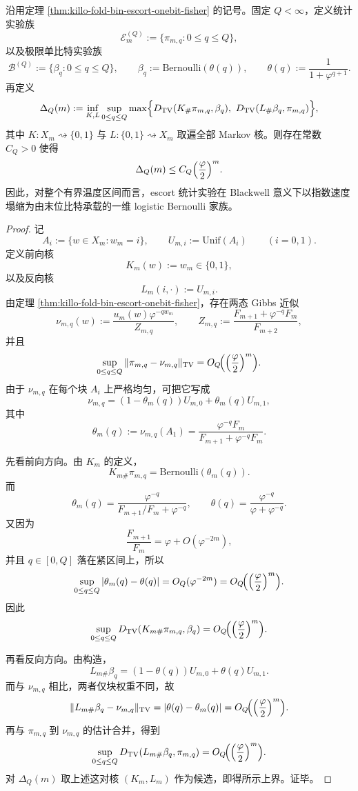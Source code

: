 \begin{theorem}\label{thm:xi-time-part65h-escort-blackwell-onebit-equivalence}
沿用定理 \ref{thm:killo-fold-bin-escort-onebit-fisher} 的记号。固定 \(Q<\infty\)，定义统计实验族
\[
\mathcal E_m^{(Q)}:=\{\pi_{m,q}:0\le q\le Q\},
\]
以及极限单比特实验族
\[
\mathcal B^{(Q)}:=\{\beta_q:0\le q\le Q\},
\qquad
\beta_q:=\mathrm{Bernoulli}(\theta(q)),
\qquad
\theta(q):=\frac{1}{1+\varphi^{q+1}}.
\]
再定义
\[
\Delta_Q(m):=
\inf_{K,L}\sup_{0\le q\le Q}
\max\Bigl\{
D_{\mathrm{TV}}(K_{\#}\pi_{m,q},\beta_q),\
D_{\mathrm{TV}}(L_{\#}\beta_q,\pi_{m,q})
\Bigr\},
\]
其中 \(K:X_m\rightsquigarrow\{0,1\}\) 与 \(L:\{0,1\}\rightsquigarrow X_m\) 取遍全部 Markov 核。则存在常数 \(C_Q>0\) 使得
\[
\Delta_Q(m)\le C_Q\Bigl(\frac{\varphi}{2}\Bigr)^m.
\]
因此，对整个有界温度区间而言，escort 统计实验在 Blackwell 意义下以指数速度塌缩为由末位比特承载的一维 logistic Bernoulli 家族。
\end{theorem}
\begin{proof}
记
\[
A_i:=\{w\in X_m:w_m=i\},
\qquad
U_{m,i}:=\mathrm{Unif}(A_i)
\qquad (i=0,1).
\]
定义前向核
\[
K_m(w):=w_m\in\{0,1\},
\]
以及反向核
\[
L_m(i,\cdot):=U_{m,i}.
\]
由定理 \ref{thm:killo-fold-bin-escort-onebit-fisher}，存在两态 Gibbs 近似
\[
\nu_{m,q}(w):=\frac{u_m(w)\varphi^{-qw_m}}{Z_{m,q}},
\qquad
Z_{m,q}:=\frac{F_{m+1}+\varphi^{-q}F_m}{F_{m+2}},
\]
并且
\[
\sup_{0\le q\le Q}\|\pi_{m,q}-\nu_{m,q}\|_{\mathrm{TV}}
=
O_Q\!\Bigl(\Bigl(\frac{\varphi}{2}\Bigr)^m\Bigr).
\]
由于 \(\nu_{m,q}\) 在每个块 \(A_i\) 上严格均匀，可把它写成
\[
\nu_{m,q}=(1-\theta_m(q))U_{m,0}+\theta_m(q)U_{m,1},
\]
其中
\[
\theta_m(q):=\nu_{m,q}(A_1)
=
\frac{\varphi^{-q}F_m}{F_{m+1}+\varphi^{-q}F_m}.
\]

先看前向方向。由 \(K_m\) 的定义，
\[
K_{m\#}\pi_{m,q}=\mathrm{Bernoulli}(\theta_m(q)).
\]
而
\[
\theta_m(q)=\frac{\varphi^{-q}}{F_{m+1}/F_m+\varphi^{-q}},
\qquad
\theta(q)=\frac{\varphi^{-q}}{\varphi+\varphi^{-q}}.
\]
又因为
\[
\frac{F_{m+1}}{F_m}=\varphi+O(\varphi^{-2m}),
\]
并且 \(q\in[0,Q]\) 落在紧区间上，所以
\[
\sup_{0\le q\le Q}|\theta_m(q)-\theta(q)|
=
O_Q(\varphi^{-2m})
=
O_Q\!\Bigl(\Bigl(\frac{\varphi}{2}\Bigr)^m\Bigr).
\]
因此
\[
\sup_{0\le q\le Q}
D_{\mathrm{TV}}(K_{m\#}\pi_{m,q},\beta_q)
=
O_Q\!\Bigl(\Bigl(\frac{\varphi}{2}\Bigr)^m\Bigr).
\]

再看反向方向。由构造，
\[
L_{m\#}\beta_q=(1-\theta(q))U_{m,0}+\theta(q)U_{m,1}.
\]
而与 \(\nu_{m,q}\) 相比，两者仅块权重不同，故
\[
\|L_{m\#}\beta_q-\nu_{m,q}\|_{\mathrm{TV}}
=
|\theta(q)-\theta_m(q)|
=
O_Q\!\Bigl(\Bigl(\frac{\varphi}{2}\Bigr)^m\Bigr).
\]
再与 \(\pi_{m,q}\) 到 \(\nu_{m,q}\) 的估计合并，得到
\[
\sup_{0\le q\le Q}
D_{\mathrm{TV}}(L_{m\#}\beta_q,\pi_{m,q})
=
O_Q\!\Bigl(\Bigl(\frac{\varphi}{2}\Bigr)^m\Bigr).
\]
对 \(\Delta_Q(m)\) 取上述这对核 \((K_m,L_m)\) 作为候选，即得所示上界。证毕。
\end{proof}

